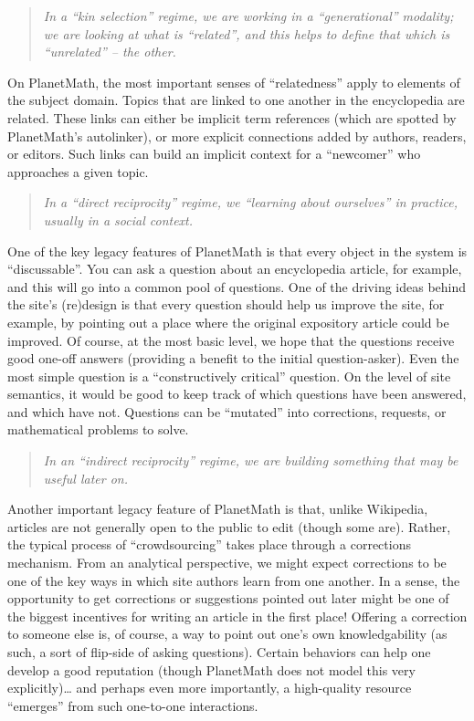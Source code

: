 \begin{quote}
\emph{In a ``kin selection'' regime, we are working in a
``generational'' modality; we are looking at what is ``related'', and
this helps to define that which is ``unrelated'' -- the other.}
\end{quote}
On PlanetMath, the most important senses of ``relatedness'' apply to
elements of the subject domain. Topics that are linked to one another in
the encyclopedia are related. These links can either be implicit term
references (which are spotted by PlanetMath's autolinker), or more
explicit connections added by authors, readers, or editors. Such links
can build an implicit context for a ``newcomer'' who approaches a given
topic.

\begin{quote}
\emph{In a ``direct reciprocity'' regime, we ``learning about
ourselves'' in practice, usually in a social context.}
\end{quote}
One of the key legacy features of PlanetMath is that every object in the
system is ``discussable''. You can ask a question about an encyclopedia
article, for example, and this will go into a common pool of questions.
One of the driving ideas behind the site's (re)design is that every
question should help us improve the site, for example, by pointing out a
place where the original expository article could be improved. Of
course, at the most basic level, we hope that the questions receive good
one-off answers (providing a benefit to the initial question-asker).
Even the most simple question is a ``constructively critical'' question.
On the level of site semantics, it would be good to keep track of which
questions have been answered, and which have not. Questions can be
``mutated'' into corrections, requests, or mathematical problems to
solve.

\begin{quote}
\emph{In an ``indirect reciprocity'' regime, we are building something
that may be useful later on.}
\end{quote}
Another important legacy feature of PlanetMath is that, unlike
Wikipedia, articles are not generally open to the public to edit (though
some are). Rather, the typical process of ``crowdsourcing'' takes place
through a corrections mechanism. From an analytical perspective, we
might expect corrections to be one of the key ways in which site authors
learn from one another. In a sense, the opportunity to get corrections
or suggestions pointed out later might be one of the biggest incentives
for writing an article in the first place! Offering a correction to
someone else is, of course, a way to point out one's own knowledgability
(as such, a sort of flip-side of asking questions). Certain behaviors
can help one develop a good reputation (though PlanetMath does not model
this very explicitly)\ldots{} and perhaps even more importantly, a
high-quality resource ``emerges'' from such one-to-one interactions.

